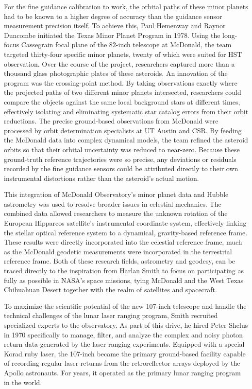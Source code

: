 For the fine guidance calibration to work, the orbital paths of these minor planets had to be known to a higher degree of accuracy than the guidance sensor measurement precision itself. To achieve this, Paul Hemenway and Raynor Duncombe initiated the Texas Minor Planet Program in 1978. Using the long-focus Cassegrain focal plane of the 82-inch telescope at McDonald, the team targeted thirty-four specific minor planets, twenty of which were suited for HST observation. Over the course of the project, researchers captured more than a thousand glass photographic plates of these asteroids. An innovation of the program was the crossing-point method. By taking observations exactly where the projected paths of two different minor planets intersected, researchers could compare the objects against the same local background stars at different times, effectively isolating and eliminating systematic star catalog errors from their orbit reductions.
The precise ground-based observations from McDonald were processed by orbit determination specialists at UT Austin and CSR. By feeding the McDonald data into complex dynamical models, the team refined the asteroid orbits so that their orbital uncertainty was reduced to near-zero. Because these ground-truth reference trajectories were so precise, any deviations or residuals recorded by the fine guidance sensors could be attributed directly to their own instrumental distortions rather than the asteroid's actual motion.

This integration of McDonald Observatory's minor planet data and Hubble astrometry was used to resolve broader issues in celestial mechanics. The combined data allowed researchers to measure the unknown rotation of the European Hipparcos satellite's instrumental coordinate system, effectively linking the stellar optical reference system to a dynamical, gravity-based reference frame. These results were directly incorporated into the celestial reference frame, much as the McDonald geodetic measurements were incorporated in the terrestrial reference frame. Both of these research fields, astrometry and geodesy, can be traced directly to the inspiration from Harlan Smith to focus on participating as fully as possible in NASA’s space missions, tying McDonald and the West Texas Chihuahuan Desert together with the realm of satellites and spacecraft.

To maximize the scientific potential of the new 107-inch telescope and handle the technical challenges of the lunar laser ranging program, Smith recruited specialized experts to the observatory. As part of this drive, he hired Peter Shelus in 1970 specifically to manage, filter, and analyze the complex and noisy photon return data generated by the laser ranging experiments. Equipped with a special Korad ruby laser, the 107-inch became the primary ground-based facility capable of recording regular laser returns from the retroreflector arrays deployed by the Apollo astronauts. For years, it operated as the primary lunar ranging program in the world. 

